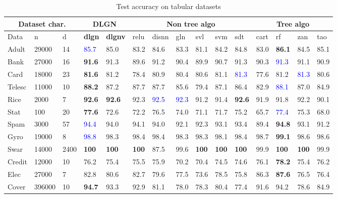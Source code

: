 \documentclass{article} %
\renewcommand{\>}{{\rightarrow}}
\renewcommand{\=}{\stackrel{\triangle}{=}}
\newcommand{\0}{{\mathbf 0}}
\begin{document}
\begin{table}[t]
\caption{Test accuracy on tabular datasets}
\label{acc-tabular}
\begin{center}
\small
\begin{tabular}{|p{0.63cm}|p{0.75cm}|p{0.43cm}|p{0.42cm}|p{0.55cm}|p{0.4cm}|p{0.5cm}|p{0.4cm}|p{0.4cm}|p{0.4cm}|p{0.4cm}|p{0.4cm}|p{0.4cm}|p{0.4cm}|p{0.40cm}|}
\hline
\multicolumn{3}{|c|}{Dataset char.} &\multicolumn{2}{|c|}{DLGN} &\multicolumn{6}{|c|}{Non tree algo} &\multicolumn{4}{|c|}{Tree algo} \\
 \hline
 Data &n &d &\textbf{dlgn} &\textbf{dlgnv} &relu &disnn &gln &svl &svm &sdt &cart &rf &zan &tao
\\ \hline 
Adult   &29000 &14 &\textcolor{blue}{85.7} &85.0 &83.2 &84.6 &83.3 &81.1 &84.2 &84.8 &83.0 &\textbf{86.1} &84.5 &85.1\\
Bank     &27000 &16 &\textbf{91.6} &91.3 &89.6 &91.2 &90.4 &89.9 &90.7 &91.3 &90.3 &\textcolor{blue}{91.3} &91.1  &90.9\\
Card     &18000 &23 &\textbf{81.6} &81.2 &78.4 &80.9 &80.4 &80.6 &81.1 &\textcolor{blue}{81.3} &77.6 &81.2 &\textcolor{blue}{81.3} &80.6\\
Telesc      &11000 &10 &\textbf{88.2} &87.2 &87.7 &87.7 &85.6 &79.4 &87.1 &86.4 &82.9 &\textcolor{blue}{88.1} &87.0 &84.9\\
Rice        &2000 &7 &\textbf{92.6} &\textbf{92.6} &92.3 &\textcolor{blue}{92.5} &\textcolor{blue}{92.3} &91.2 &91.4 &\textbf{92.6} &91.9 &91.8 &92.2 &90.1\\
Stat     &100 &20   &\textbf{77.6} &72.6 &72.2 &76.5 &74.0 &71.1 &71.7 &75.2 &65.7 &\textcolor{blue}{77.4} &75.3 &68.0\\
Spam   &3000 &57   &\textcolor{blue}{94.4} &94.0 &94.1 &94.0 &92.1 &92.3 &93.1 &93.4 &89.4 &\textbf{94.8} &93.1 &91.2\\
Gyro       &19000 &8 &\textcolor{blue}{98.8} &98.3 &98.4 &98.4 &98.3 &98.3 &98.1 &98.4 &98.7 &\textbf{99.1} &98.6 &98.6\\
Swar        &14000 &2400  &\textbf{100} &\textbf{100} &\textbf{100} &87.5 &99.6 &\textbf{100} &\textbf{100} &\textbf{100} &99.9 &\textbf{100} &\textbf{100}  &99.9\\
Credit       &12000 &10    &76.2 &75.4 &75.5 &75.9 &70.2 &70.4 &74.5 &74.6 &76.1 &\textbf{78.2} &75.4 &76.2\\
Elec   &27000 &7  &82.8 &80.6 &82.7 &79.6 &77.5 &73.6 &78.5 &75.8 &86.3 &\textbf{87.6} &76.5 &76.4\\
Cover   &396000 &10  &\textbf{94.7} &93.3 &92.9 &81.1 &78.0 &78.3 &80.4 &77.4 &91.6 &94.2 &78.6 &84.9\\

\end{tabular}
\end{center}
\end{table}
\end{document}
